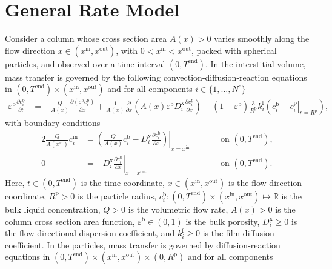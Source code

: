 \documentclass{article}
\begin{document}
\section*{General Rate Model}
Consider a column whose cross section area $A(x) > 0$ varies smoothly along the flow direction $x \in (x^{\mathrm{in}}, x^{\mathrm{out}})$, with $0 < x^{\mathrm{in}} < x^{\mathrm{out}}$, packed with spherical particles, and observed over a time interval $(0, T^{\mathrm{end}})$.
In the interstitial volume, mass transfer is governed by the following convection-diffusion-reaction equations in $(0, T^{\mathrm{end}})\times (x^{\mathrm{in}}, x^{\mathrm{out}})$ and for all components $i\in\{1, \dots, N^{\mathrm{c}} \}$
\begin{align}
    \varepsilon^{\mathrm{b}} \frac{\partial c^{\mathrm{b}}_{i}}{\partial t}
    &= - \frac{Q}{A(x)} \frac{\partial \left( \varepsilon^{\mathrm{b}} c^{\mathrm{b}}_{i} \right)}{\partial x}
        + \frac{1}{A(x)} \frac{\partial}{\partial x} \left( A(x) \varepsilon^{\mathrm{b}} D^{\mathrm{x}}_{i} \frac{\partial c^{\mathrm{b}}_{i}}{\partial x} \right)
        - \left(1 - \varepsilon^{\mathrm{b}} \right) \frac{3}{R^{\mathrm{p}}} k^{\mathrm{f}}_{i} \left(c^{\mathrm{b}}_{i} - \left. c^{\mathrm{p}}_{i} \right|_{r = R^{\mathrm{p}}} \right),
\end{align}
with boundary conditions
\begin{alignat}{2}
    \frac{Q}{A(x^{\mathrm{in}})} c^{\mathrm{in}}_{i}
    &= \left.\left( \frac{Q}{A(x)} c^{\mathrm{b}}_{i} - D^{\mathrm{x}}_{i} \frac{\partial c^{\mathrm{b}}_{i}}{\partial x}\right)\right|_{x=x^{\mathrm{in}}}
    & & \qquad\text{on }(0, T^{\mathrm{end}}),
    \\
    0
    &= - D^{\mathrm{x}}_{i} \left. \frac{\partial c^{\mathrm{b}}_{i}}{\partial x} \right|_{x=x^{\mathrm{out}}}
    & & \qquad\text{on }(0, T^{\mathrm{end}}).
\end{alignat}
Here, $t\in (0, T^{\mathrm{end}})$ is the time coordinate, $x\in (x^{\mathrm{in}}, x^{\mathrm{out}})$ is the flow direction coordinate, $R^{\mathrm{p}}> 0$ is the particle radius, $c^{\mathrm{b}}_{i}\colon (0, T^{\mathrm{end}})\times (x^{\mathrm{in}}, x^{\mathrm{out}}) \mapsto \mathbb{R}$ is the bulk liquid concentration, $Q> 0$ is the volumetric flow rate, $A(x) > 0$ is the column cross section area function, $\varepsilon^{\mathrm{b}}\in (0, 1)$ is the bulk porosity, $D^{\mathrm{x}}_{i}\geq 0$ is the flow-directional dispersion coefficient, and $k^{\mathrm{f}}_{i}\geq 0$ is the film diffusion coefficient.
In the particles, mass transfer is governed by diffusion-reaction equations in $(0, T^{\mathrm{end}}) \times (x^{\mathrm{in}}, x^{\mathrm{out}})\times (0, R^{\mathrm{p}})$ and for all components
\end{document}
